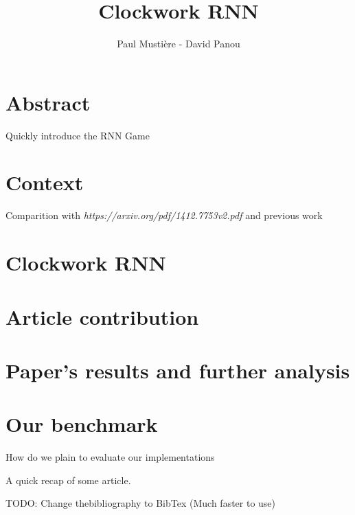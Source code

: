 \documentclass[a4paper,10pt]{article}
\title{Clockwork RNN}
\author{Paul Mustière - David Panou}
\begin{document}
\maketitle

\section{Abstract}

Quickly introduce the RNN Game

\section{Context}

Comparition with \textit{https://arxiv.org/pdf/1412.7753v2.pdf} and previous work

\section{Clockwork RNN}

\section{Article contribution}

\section{Paper's results and further analysis}

\section{Our benchmark}

How do we plain to evaluate our implementations

A quick recap of some article.

TODO: Change thebibliography to BibTex (Much faster to use)
\end{document}
